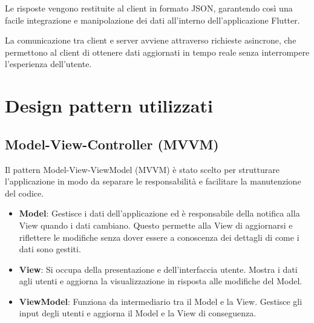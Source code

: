 Le risposte vengono restituite al client in formato JSON, garantendo così una facile integrazione e manipolazione dei dati all'interno dell'applicazione Flutter.

La comunicazione tra client e server avviene attraverso richieste asincrone, che permettono al client di ottenere dati aggiornati in tempo reale senza interrompere l'esperienza dell'utente.

\section{Design pattern utilizzati}

\subsection{Model-View-Controller (MVVM)}
Il pattern Model-View-ViewModel (MVVM) è stato scelto per strutturare l'applicazione in modo da separare le responsabilità e facilitare la manutenzione del codice.

\begin{itemize}
	\item \textbf{Model}: Gestisce i dati dell'applicazione ed è responsabile della notifica alla View quando i dati cambiano. Questo permette alla View di aggiornarsi e riflettere le modifiche senza dover essere a conoscenza dei dettagli di come i dati sono gestiti.

	\item \textbf{View}: Si occupa della presentazione e dell'interfaccia utente. Mostra i dati agli utenti e aggiorna la visualizzazione in risposta alle modifiche del Model.

	\item \textbf{ViewModel}: Funziona da intermediario tra il Model e la View. Gestisce gli input degli utenti e aggiorna il Model e la View di conseguenza.
\end{itemize}

